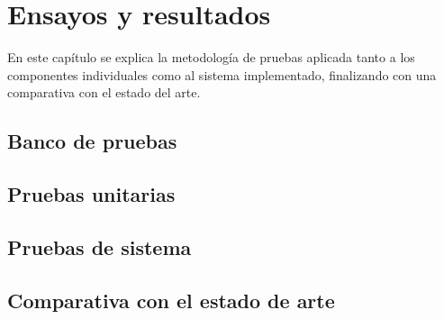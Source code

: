 
\chapter{Ensayos y resultados} %

\label{Chapter4} %

En este capítulo se explica la metodología de pruebas aplicada tanto a los componentes individuales como al sistema implementado, finalizando con una comparativa con el estado del arte.


\section{Banco de pruebas}
\label{sec:Banco de pruebas}
\section{Pruebas unitarias}
\label{sec:Pruebas unitarias}
\section{Pruebas de sistema}
\label{sec:Pruebas de sistema}
\section{Comparativa con el estado de arte}
\label{sec:Comparativa con el estado de arte}